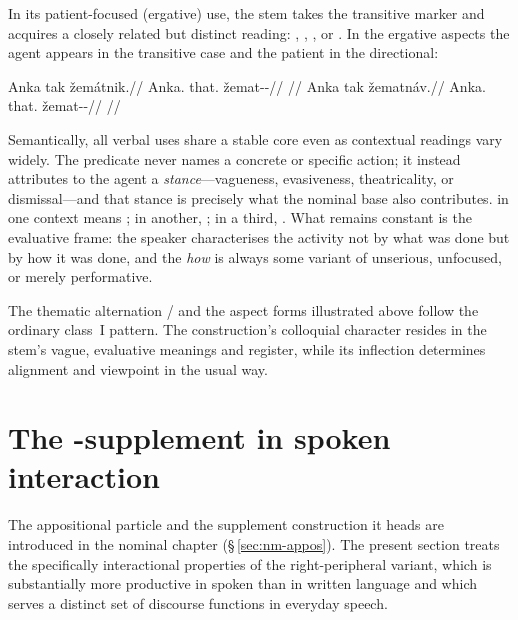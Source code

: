 In its patient-focused (ergative) use, the stem  takes the
transitive marker  and acquires a closely related but distinct reading:
, , , or . In the ergative
aspects the agent appears in the transitive case and the patient in the
directional:

\pex
\a
\begingl
\gla Anka tak žemátnik.//
\glb Anka.\Trs{} that.\Dir{} žemat-\Trs{}-\Pf{}//
\glft {}//
\endgl
\a
\begingl
\gla Anka tak žematnáv.//
\glb Anka.\Trs{} that.\Dir{} žemat-\Trs{}-\Ret{}//
\glft {}//
\endgl
\xe

Semantically, all verbal uses share a stable core even as contextual readings
vary widely. The predicate never names a concrete or specific action; it instead
attributes to the agent a \emph{stance}---vagueness, evasiveness, theatricality,
or dismissal---and that stance is precisely what the nominal base also
contributes.  in one context means ; in another, ; in a third, . What remains constant is the evaluative frame: the
speaker characterises the activity not by what was done but by how it was done,
and the \textit{how} is always some variant of unserious, unfocused, or merely
performative.

The thematic alternation / and the aspect forms
illustrated above follow the ordinary class~I pattern. The construction's
colloquial character resides in the stem's vague, evaluative meanings and
register, while its inflection determines alignment and viewpoint in the
usual way.

\section{The -supplement in spoken interaction}
\label{sec:spoken-ty}

The appositional particle  and the supplement construction it heads
are introduced in the nominal chapter (\S\,\ref{sec:nm-appos}). The present
section treats the specifically interactional properties of the
right-peripheral variant, which is substantially more productive in spoken
than in written language and which serves a distinct set of discourse functions
in everyday speech.

